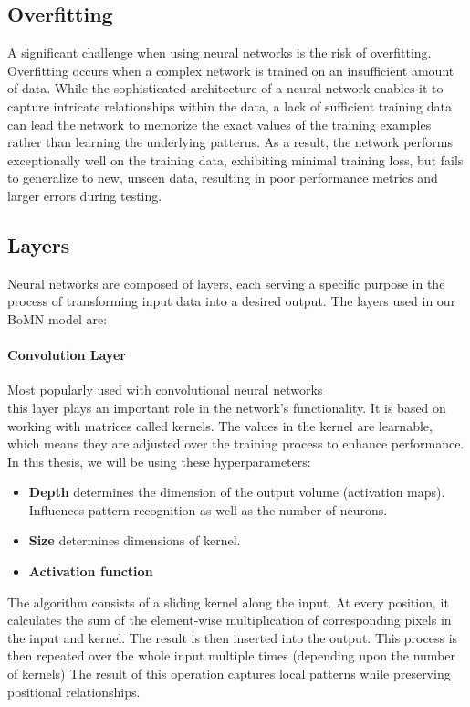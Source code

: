 \subsection{Overfitting}
A significant challenge when using neural networks is the risk of overfitting. Overfitting occurs when a complex network is trained on an insufficient amount of data. While the sophisticated architecture of a neural network enables it to capture intricate relationships within the data, a lack of sufficient training data can lead the network to memorize the exact values of the training examples rather than learning the underlying patterns. As a result, the network performs exceptionally well on the training data, exhibiting minimal training loss, but fails to generalize to new, unseen data, resulting in poor performance metrics and larger errors during testing.

\subsection{Layers}
Neural networks are composed of layers, each serving a specific purpose in the process of transforming input data into a desired output.  The layers used in our BoMN model are:

\paragraph{Convolution Layer}
Most popularly used with convolutional neural networks\\\cite{convolutional} this layer plays an important role in the network's functionality. It is based on working with matrices called kernels.  The values in the kernel are learnable, which means they are adjusted over the training process to enhance performance. In this thesis, we will be using these hyperparameters:
\begin{itemize}
	\item \textbf{Depth} determines the dimension of the output volume (activation maps). Influences pattern recognition as well as the number of neurons.
	\item \textbf{Size} determines dimensions of kernel.
	\item \textbf{Activation function}
\end{itemize}
The algorithm consists of a sliding kernel along the input. At every position, it calculates the sum of the element-wise multiplication of corresponding pixels in the input and kernel. The result is then inserted into the output. This process is then repeated over the whole input multiple times (depending upon the number of kernels) %
The result of this operation captures local patterns while preserving positional relationships.


